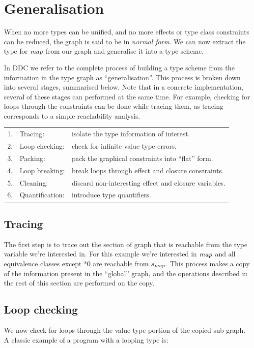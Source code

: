 \clearpage{}
\section{Generalisation}
\label{inference:generalisation}

When no more types can be unified, and no more effects or type class constraints can be reduced, the graph is said to be in \emph{normal form}. We can now extract the type for $\operatorname{\mathit{map}}$ from our graph and generalise it into a type scheme.

In DDC we refer to the complete process of building a type scheme from the information in the type graph as ``generalisation''. This process is broken down into several stages, summarised below. Note that in a concrete implementation, several of these stages can performed at the same time. For example, checking for loops through the constraints can be done while tracing them, as tracing corresponds to a simple reachability analysis.

\bigskip
\qq
\begin{tabular}{lll}
	1. & Tracing:		& isolate the type information of interest. \\
	2. & Loop checking:	& check for infinite value type errors. \\
	3. & Packing:		& pack the graphical constraints into ``flat'' form. \\
	4. & Loop breaking:	& break loops through effect and closure constraints. \\
	5. & Cleaning:		& discard non-interesting effect and closure variables. \\
	6. & Quantification:	& introduce type quantifiers. 
\end{tabular}


\subsection{Tracing}
The first step is to trace out the section of graph that is reachable from the type variable we're interested in. For this example we're interested in $\operatorname{\mathit{map}}$ and all equivalence classes except *0 are reachable from $s_{\operatorname{\mathit{map}}}$. This process makes a copy of the information present in the ``global'' graph, and the operations described in the rest of this section are performed on the copy. 


\subsection{Loop checking}
We now check for loops through the value type portion of the copied sub-graph. A classic example of a program with a looping type is:

